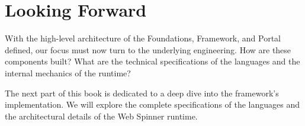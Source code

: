 \section{Looking Forward}
\label{sec:architecture-forward}

With the high-level architecture of the Foundations, Framework, and Portal defined, our focus must now turn to the underlying engineering. How are these components built? What are the technical specifications of the languages and the internal mechanics of the runtime?

The next part of this book is dedicated to a deep dive into the framework's implementation. We will explore the complete specifications of the languages and the architectural details of the Web Spinner runtime.
